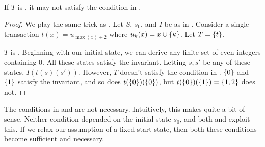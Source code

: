 \begin{claim}
  If $T$ is \Iconfluent, it may not satisfy the condition in
  .
\end{claim}
\begin{proof}
  We play the same trick as . Let $S$, $s_0$,
  and $I$ be as in . Consider a single
  transaction $t(x) = u_{\max(x) + 2}$ where $u_k(x) = x \cup \{k\}$. Let $T
  = \{t\}$.

  $T$ is \Iconfluent{}. Beginning with our initial state, we can derive any
  finite set of even integers containing $0$. All these states satisfy the
  invariant. Letting $s, s'$ be any of these states, $I(t(s)(s'))$.
  However, $T$ doesn't satisfy the condition in .
  $\{0\}$ and $\{1\}$ satisfy the invariant, and so does
  $t(\{0\})(\{0\})$, but $t(\{0\})(\{1\}) = \{1, 2\}$ does not.
\end{proof}


The conditions in  and 
are not necessary. Intuitively, this makes quite a bit of sense. Neither
condition depended on the initial state $s_0$, and both
 and  exploit this.
If we relax our assumption of a fixed start state, then both these conditions
become sufficient and necessary.

